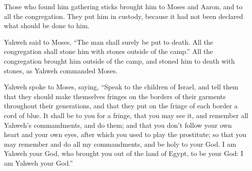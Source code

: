{Those who found him gathering sticks brought him to Moses and Aaron, and to all the congregation.
They put him in custody, because it had not been declared what should be done to him.
\par }{\PP {}Yahweh said to Moses, “The man shall surely be put to death. All the congregation shall stone him with stones outside of the camp.”
All the congregation brought him outside of the camp, and stoned him to death with stones, as Yahweh commanded Moses.
\par }{\PP {}Yahweh spoke to Moses, saying,
“Speak to the children of Israel, and tell them that they should make themselves fringes on the borders of their garments throughout their generations, and that they put on the fringe
 of each border a cord of blue.
It shall be to you for a fringe, that you may see it, and remember all Yahweh’s commandments, and do them; and that you don’t follow your own heart and your own eyes, after which you used to play the prostitute;
so that you may remember and do all my commandments, and be holy to your God.
I am Yahweh your God, who brought you out of the land of Egypt, to be your God: I am Yahweh your God.”

}
